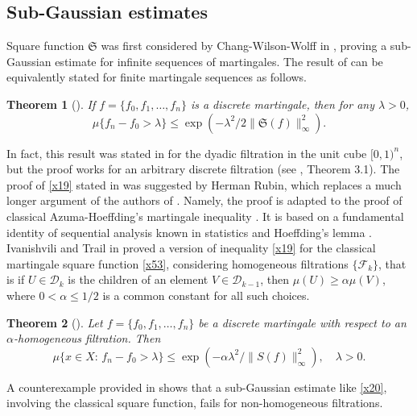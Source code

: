 \documentclass[12pt,reqno,fleqn]{amsart}
\newtheorem{OldTheorem}{Theorem}
\theoremstyle{definition}
\theoremstyle{definition}
\theoremstyle{remark}
\def\ZF{\ensuremath{\mathscr  F}}
\def\ZS{\ensuremath{\mathfrak S}}
\def\ZD{\ensuremath{\mathscr  D}}
\numberwithin{equation}{section}
\newcommand {\e }[1]{\eqref{#1}}
\begin{document}
\subsection{Sub-Gaussian estimates}
Square function $\ZS$ was first considered by Chang-Wilson-Wolff in \cite{CWW}, proving a sub-Gaussian estimate for infinite sequences of martingales.  The result of \cite{CWW} can be equivalently stated for finite martingale sequences as follows.
\begin{OldTheorem}[\cite{CWW}]\label{OT1}
	If $f=\{f_0,f_1,\ldots,f_n\}$ is a discrete martingale, then for any $\lambda>0$,
	\begin{equation}\label{x19}
		\mu\{ f_n -f_0>\lambda\}\le \exp\left(-\lambda^2/2\|\ZS(f)\|_\infty^2\right).
	\end{equation} 
\end{OldTheorem}
In fact, this result was stated in \cite{CWW} for the dyadic filtration in the unit cube $[0,1)^n$, but the proof works for an arbitrary discrete filtration (see \cite{CWW}, Theorem 3.1). The proof of \e{x19} stated in \cite{CWW} was suggested by Herman Rubin, which replaces a much longer argument of the authors of \cite{CWW}. Namely, the proof is adapted to the proof of classical Azuma-Hoeffding's martingale inequality \cite{Azu, Hoe}. It is based on a fundamental identity of sequential analysis known in statistics and Hoeffding's lemma \cite{Hoe}. Ivanishvili and Trail in \cite{IvTr} proved a version of inequality \e{x19} for the classical martingale square function \e{x53}, considering homogeneous filtrations $\{\ZF_k\}$, that is  if $U\in \ZD_{k}$ is the children of an element $V\in \ZD_{k-1}$, then $\mu(U)\ge \alpha\mu(V)$, where $0<\alpha\le 1/2$ is a common constant for all such choices. 
\begin{OldTheorem}[\cite{IvTr}]\label{OT2}
	Let $f=\{f_0,f_1,\ldots,f_n\}$ be a discrete martingale with respect to an $\alpha$-homogeneous filtration.  Then
	\begin{equation}\label{x20}
		\mu\{x\in X:\, f_n-f_0>\lambda\}\le \exp\left(-\alpha \lambda^2/\|S(f)\|_\infty^2\right),\quad \lambda>0.
	\end{equation} 
\end{OldTheorem}
A counterexample provided in \cite{IvTr} shows that a sub-Gaussian estimate like \e{x20}, involving the classical square function, fails for non-homogeneous filtrations.
\end{document}
